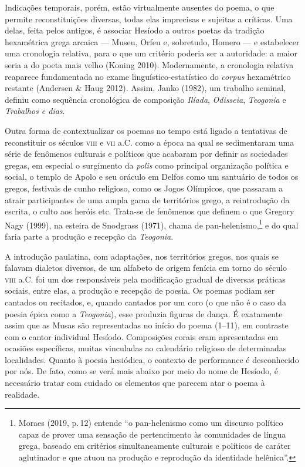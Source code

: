 Indicações temporais, porém, estão virtualmente ausentes do poema, o que
permite reconstituições diversas, todas elas imprecisas e sujeitas a
críticas. Uma delas, feita pelos antigos, é associar Hesíodo a outros
poetas da tradição hexamétrica grega arcaica --- Museu, Orfeu e,
sobretudo, Homero --- e estabelecer uma cronologia relativa, para o que
um critério poderia ser a autoridade: a maior seria a do poeta mais
velho (Koning 2010). Modernamente, a cronologia relativa reaparece
fundamentada no exame linguístico-estatístico do \textit{corpus}
hexamétrico restante (Andersen \& Haug 2012). Assim, Janko (1982), um
trabalho seminal, definiu como sequência cronológica de composição
\textit{Ilíada}, \textit{Odisseia}, \textit{Teogonia} e \textit{Trabalhos e
dias}.

Outra forma de contextualizar os poemas no tempo está ligado a
tentativas de reconstituir os séculos \textsc{viii} e \textsc{vii} a.C. 
como a época na qual se sedimentaram uma série de fenômenos culturais e 
políticos que acabaram por definir as sociedades gregas, em especial o 
surgimento da \textit{polis} como principal organização política e social, 
o templo de Apolo e seu oráculo em Delfos como um santuário de todos os gregos,
festivais de cunho religioso, como os Jogos Olímpicos, que passaram a
atrair participantes de uma ampla gama de territórios grego, a
reintrodução da escrita, o culto aos heróis etc. Trata-se de fenômenos
que definem o que Gregory Nagy (1999), na esteira de Snodgrass (1971),
chama de pan-helenismo,\footnote{Moraes (2019, p.\,12) entende ``o
  pan-helenismo como um discurso político capaz de prover uma sensação
  de pertencimento às comunidades de língua grega, baseado em critérios
  simultaneamente culturais e políticos de caráter aglutinador e que
  atuou na produção e reprodução da identidade helênica''.} e do qual
faria parte a produção e recepção da \textit{Teogonia}.

A introdução paulatina, com adaptações, nos territórios gregos, nos
quais se falavam dialetos diversos, de um alfabeto de origem fenícia em
torno do século \textsc{viii} a.C. foi um dos responsáveis pela modificação
gradual de diversas práticas sociais, entre elas, a produção e recepção
de poesia. Os poemas podiam ser cantados ou recitados, e, quando
cantados por um coro (o que não é o caso da poesia épica como a
\textit{Teogonia}), esse produzia figuras de dança. É exatamente assim que
as Musas são representadas no início do poema (1--11), em contraste com o
cantor individual Hesíodo. Composições corais eram apresentadas em
ocasiões específicas, muitas vinculadas ao calendário religioso de
determinadas localidades. Quanto à poesia hesiódica, o contexto de
performance é desconhecido por nós. De fato, como se verá mais abaixo
por meio do nome de Hesíodo, é necessário tratar com cuidado os
elementos que parecem atar o poema à realidade.

